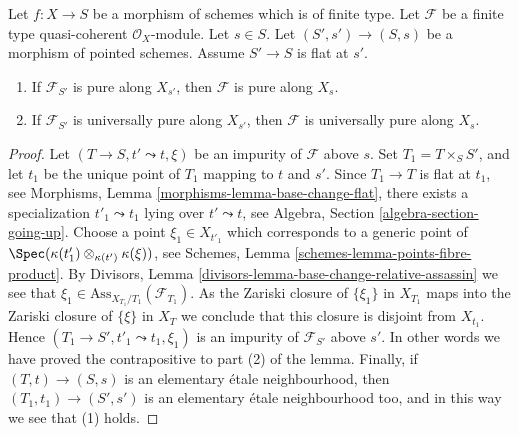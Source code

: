 \begin{lemma}
\label{lemma-flat-descend-pure}
Let $f : X \to S$ be a morphism of schemes which is of finite type.
Let $\mathcal{F}$ be a finite type quasi-coherent $\mathcal{O}_X$-module.
Let $s \in S$. Let $(S', s') \to (S, s)$ be a morphism of pointed schemes.
Assume $S' \to S$ is flat at $s'$.
\begin{enumerate}
\item If $\mathcal{F}_{S'}$ is pure along $X_{s'}$,
then $\mathcal{F}$ is pure along $X_s$.
\item If $\mathcal{F}_{S'}$ is universally pure along $X_{s'}$,
then $\mathcal{F}$ is universally pure along $X_s$.
\end{enumerate}
\end{lemma}

\begin{proof}
Let $(T \to S, t' \leadsto t, \xi)$ be an impurity of
$\mathcal{F}$ above $s$. Set $T_1 = T \times_S S'$, and let $t_1$
be the unique point of $T_1$ mapping to $t$ and $s'$. Since
$T_1 \to T$ is flat at $t_1$, see
Morphisms, Lemma \ref{morphisms-lemma-base-change-flat},
there exists a specialization $t'_1 \leadsto t_1$ lying over
$t' \leadsto t$, see
Algebra, Section \ref{algebra-section-going-up}.
Choose a point $\xi_1 \in X_{t'_1}$ which corresponds to a generic
point of $\Spec(\kappa(t'_1) \otimes_{\kappa(t')} \kappa(\xi))$, see
Schemes, Lemma \ref{schemes-lemma-points-fibre-product}.
By
Divisors, Lemma \ref{divisors-lemma-base-change-relative-assassin}
we see that $\xi_1 \in \text{Ass}_{X_{T_1}/T_1}(\mathcal{F}_{T_1})$.
As the Zariski closure of $\{\xi_1\}$ in $X_{T_1}$ maps into the
Zariski closure of $\{\xi\}$ in $X_T$ we conclude that
this closure is disjoint from $X_{t_1}$. Hence
$(T_1 \to S', t'_1 \leadsto t_1, \xi_1)$
is an impurity of $\mathcal{F}_{S'}$ above $s'$.
In other words we have proved the contrapositive to part (2) of the
lemma. Finally, if $(T, t) \to (S, s)$ is an elementary
\'etale neighbourhood, then $(T_1, t_1) \to (S', s')$ is an
elementary \'etale neighbourhood too, and in this way we see that (1) holds.
\end{proof}
